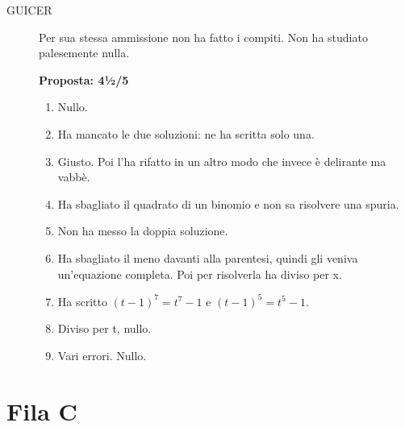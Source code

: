 \documentclass[11pt]{report}
\begin{document}
\begin{description}
\item[GUICER] Per sua stessa ammissione non ha fatto i compiti. Non ha studiato palesemente nulla.

\textbf{Proposta: 4½/5}
\begin{enumerate}
    \item Nullo.
    \item Ha mancato le due soluzioni: ne ha scritta solo una.
    \item Giusto. Poi l'ha rifatto in un altro modo che invece è delirante ma vabbè.
    \item Ha sbagliato il quadrato di un binomio e non sa risolvere una spuria.
    \item Non ha messo la doppia soluzione.
    \item Ha sbagliato il meno davanti alla parentesi, quindi gli veniva un'equazione completa. Poi per risolverla ha diviso per x.
    \item Ha scritto $(t-1)^7=t^7-1$ e $(t-1)^5 = t^5-1$.
    \item Diviso per t, nullo.
    \item Vari errori. Nullo.
\end{enumerate}

\end{description}

\section*{Fila C}
\end{document}
